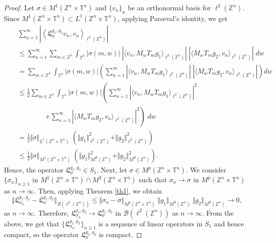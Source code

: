 \documentclass[a4paper,11pt, reqno]{amsart}
\theoremstyle{plain}
\theoremstyle{definition}
\theoremstyle{remark}
\def \Z{{\mathbb Z}}
\def \T{{\mathbb T}}
\begin{document}
\begin{proof}
Let $\sigma \in M^1(\Z^n \times \T^n)$ and $\{ v_n \}_n$ be an orthonormal basis for $\ell^2(\Z^n)$. Since $M^1(\Z^n \times \T^n) \subset L^1(\Z^n \times \T^n)$, applying Parseval's identity, we get
\begin{eqnarray*}
&& \sum_{n=1}^\infty \left| \left\langle \mathfrak{L}^{g_1, g_2}_{\sigma} v_n, v_n \right\rangle_{\ell^2(\Z^n)} \right| \\
&& \leq \sum_{n=1}^\infty  \sum_{m \in \Z^n}  \int_{\T^n} \left| \sigma (m,w) \right| \; \left| \langle v_n, M_w T_m g_1 \rangle_{\ell^2(\Z^n)} \right| \; \left| \langle M_w T_m g_2 , v_n \rangle_{\ell^2(\Z^n)} \right| \; dw\\
&& = \sum_{m \in \Z^n}  \int_{\T^n} \left| \sigma (m,w) \right| \left( \sum_{n=1}^\infty  \left| \langle v_n, M_w T_m g_1 \rangle_{\ell^2(\Z^n)} \right|\;  \left| \langle M_w T_m g_2 , v_n \rangle_{\ell^2(\Z^n)} \right| \right) dw \\
&& \leq \frac{1}{2} \sum_{m \in \Z^n}  \int_{\T^n} \left| \sigma (m,w) \right| \left( \sum_{n=1}^\infty |\langle v_n, M_w T_m g_1 \rangle_{\ell^2(\Z^n)}|^2 \right. \\
&& \qquad \qquad \left.  + \sum_{n=1}^\infty |\langle M_w T_m g_2, v_n \rangle_{\ell^2(\Z^n)}|^2 \right) \; dw\\
&& = \frac{1}{2} \Vert \sigma \Vert_{L^1(\Z^n \times \T^n)} \; (\Vert g_1 \Vert^2_{\ell^2(\Z^n)} + \Vert g_2 \Vert^2_{\ell^2(\Z^n)}) \\
&& \leq \frac{1}{2} \Vert \sigma \Vert_{M^1(\Z^n \times \T^n)} \; (\Vert g_1 \Vert^2_{M^{\Phi}(\Z^n)} + \Vert g_2 \Vert^2_{M^{\Phi}(\Z^n)}).   
\end{eqnarray*}
Hence, the operator $\mathfrak{L}^{g_1, g_2}_{\sigma} \in S_1$. Next, let $\sigma \in M^p(\Z^n \times \T^n)$. We consider $\{ \sigma_n \}_{n \geq 1}$ in $M^1(\Z^n \times \T^n) \cap M^2(\Z^n \times \T^n)$ such that $\sigma_n \to \sigma$ in $M^p(\Z^n \times \T^n)$ as $n \to \infty$. Then, applying Theorem \ref{th1}, we obtain
\[ \Vert \mathfrak{L}^{g_1, g_2}_{\sigma_n} - \mathfrak{L}^{g_1, g_2}_{\sigma}  \Vert_{\mathcal{B}(\ell^2(\Z^n))} \leq \Vert \sigma_n - \sigma \Vert_{M^p(\Z^n \times \T^n)} \; \Vert g_1 \Vert_{M^{\Phi}(\Z^n)} \; \Vert g_2 \Vert_{M^{\Phi}(\Z^n)}  \to 0, \]
as $n \to \infty$. Therefore, $\mathfrak{L}^{g_1, g_2}_{\sigma_n} \to \mathfrak{L}^{g_1, g_2}_{\sigma} $ in $\mathcal{B}(\ell^2(\Z^n))$ as $n \to \infty$. From the above, we get that $ \{ \mathfrak{L}^{g_1, g_2}_{\sigma_n} \}_{n \geq 1}$ is a sequence of linear operators in $S_1$ and hence compact, so the operator $\mathfrak{L}^{g_1, g_2}_{\sigma}$ is compact. 
\end{proof}
\end{document}
